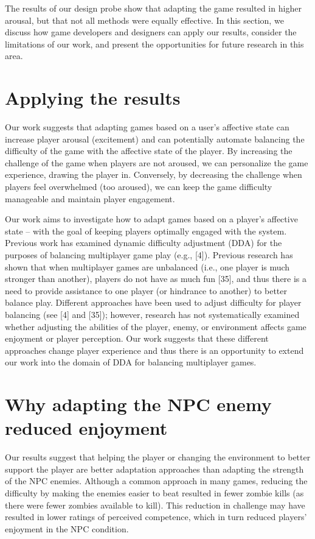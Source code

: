 
The results of our design probe show that adapting the game resulted in higher arousal, but that not all methods were equally effective. In this section, we discuss how game developers and designers can apply our results, consider the limitations of our work, and present the opportunities for future research in this area.

\section{Applying the results}
Our work suggests that adapting games based on a user’s affective state can increase player arousal (excitement) and can potentially automate balancing the difficulty of the game with the affective state of the player. By increasing the challenge of the game when players are not aroused, we can personalize the game experience, drawing the player in.  Conversely, by decreasing the challenge when players feel overwhelmed (too aroused), we can keep the game difficulty manageable and maintain player engagement.

Our work aims to investigate how to adapt games based on a player’s affective state – with the goal of keeping players optimally engaged with the system. Previous work has examined dynamic difficulty adjustment (DDA) for the purposes of balancing multiplayer game play (e.g., [4]). Previous research has shown that when multiplayer games are unbalanced (i.e., one player is much stronger than another), players do not have as much fun [35], and thus there is a need to provide assistance to one player (or hindrance to another) to better balance play. Different approaches have been used to adjust difficulty for player balancing (see [4] and [35]); however, research has not systematically examined whether adjusting the abilities of the player, enemy, or environment affects game enjoyment or player perception. Our work suggests that these different approaches change player experience and thus there is an opportunity to extend our work into the domain of DDA for balancing multiplayer games.

\section{Why adapting the NPC enemy reduced enjoyment}
Our results suggest that helping the player or changing the environment to better support the player are better adaptation approaches than adapting the strength of the NPC enemies. Although a common approach in many games, reducing the difficulty by making the enemies easier to beat resulted in fewer zombie kills (as there were fewer zombies available to kill). This reduction in challenge may have resulted in lower ratings of perceived competence, which in turn reduced players’ enjoyment in the NPC condition.


